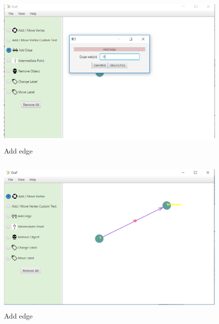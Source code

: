 \documentclass[a4paper,10pt]{article}
\begin{document}
	\paragraph{}
	
\begin{figure}[H]
		\centering
		\includegraphics[height = 3in]{addEdge1.png}
		\caption[Optional caption]{Add edge}
		\label{fig:Repository}
	\end{figure}
\paragraph{}

\begin{figure}[H]
		\centering
		\includegraphics[height = 3in]{addEdge2.png}
		\caption[Optional caption]{Add edge}
		\label{fig:Repository}
	\end{figure}
\paragraph{}
\end{document}
